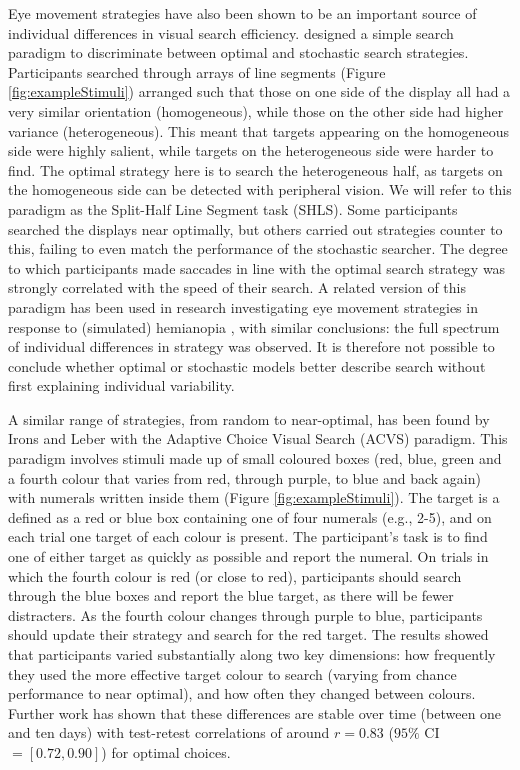 \documentclass[Afour, sageapa, times]{sagej}
\begin{document}
Eye movement strategies have also been shown to be an important source of individual differences in visual search efficiency. \cite{nowakowska2017} designed a simple search paradigm to discriminate between optimal \cite{najemnik-geisler2008} and stochastic  \cite{clarke2016} search strategies. Participants searched through arrays of line segments (Figure \ref{fig:exampleStimuli}) arranged such that those on one side of the display all had a very similar orientation (homogeneous), while those on the other side had higher variance (heterogeneous). This meant that targets appearing on the homogeneous side were highly salient, while targets on the heterogeneous side were harder to find. The optimal strategy here is to search the heterogeneous half, as targets on the homogeneous side can be detected with peripheral vision. We will refer to this paradigm as the Split-Half Line Segment task (SHLS). Some participants searched the displays near optimally, but others carried out strategies counter to this, failing to even match the performance of the stochastic searcher. The degree to which participants made saccades in line with the optimal search strategy was strongly correlated with the speed of their search. A related version of this paradigm has been used in research investigating eye movement strategies in response to (simulated) hemianopia \cite{nowakowska2016,nowakowska2018}, with similar conclusions: the full spectrum of individual differences in strategy was observed. It is therefore not possible to conclude whether optimal or stochastic models better describe search without first explaining individual variability.

A similar range of strategies, from random to near-optimal, has been found by Irons and Leber \citeyear{irons-leber2016} with the Adaptive Choice Visual Search (ACVS) paradigm. This paradigm involves stimuli made up of small coloured boxes (red, blue, green and a fourth colour that varies from red, through purple, to blue and back again) with numerals written inside them (Figure \ref{fig:exampleStimuli}). The target is a defined as a red or blue box containing one of four numerals (e.g., 2-5), and on each trial one target of each colour is present. The participant's task is to find one of either target as quickly as possible and report the numeral. On trials in which the fourth colour is red (or close to red), participants should search through the blue boxes and report the blue target, as there will be fewer distracters. As the fourth colour changes through purple to blue, participants should update their strategy and search for the red target. The results showed that participants varied substantially along two key dimensions: how frequently they used the more effective target colour to search (varying from chance performance to near optimal), and how often they changed between colours. Further work \cite{irons-leber2018} has shown that these differences are stable over time (between one and ten days) with test-retest correlations of around $r = 0.83$ ($95\%$ CI $= [0.72, 0.90]$) for optimal choices.
\end{document}
